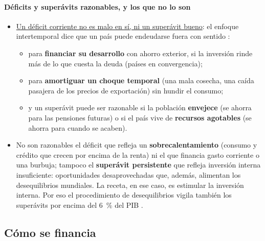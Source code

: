 \documentclass[11pt]{article}
\begin{document}
\paragraph{Déficits y superávits razonables, y los que no lo son}
\begin{itemize}
\item \uline{Un déficit corriente no es malo en sí, ni un superávit bueno}: el enfoque intertemporal dice que un país puede endeudarse fuera con sentido \parencite{FMI2013CaseStudy,BlanchardGiavazzi2002}:
  \begin{itemize}
  \item para \textbf{financiar su desarrollo} con ahorro exterior, si la inversión rinde más de lo que cuesta la deuda (países en convergencia);
  \item para \textbf{amortiguar un choque temporal} (una mala cosecha, una caída pasajera de los precios de exportación) sin hundir el consumo;
  \item y un superávit puede ser razonable si la población \textbf{envejece} (se ahorra para las pensiones futuras) o si el país vive de \textbf{recursos agotables} (se ahorra para cuando se acaben).
  \end{itemize}
\item No son razonables el déficit que refleja un \textbf{sobrecalentamiento} (consumo y crédito que crecen por encima de la renta) ni el que financia gasto corriente o una burbuja; tampoco el \textbf{superávit persistente} que refleja inversión interna insuficiente: oportunidades desaprovechadas que, además, alimentan los desequilibrios mundiales. La receta, en ese caso, es estimular la inversión interna. Por eso el procedimiento de desequilibrios vigila también los superávits por encima del 6~\% del PIB \parencite{CE2025AMR2026}.
\end{itemize}

\subsection{Cómo se financia}\label{sec:financiacion}
\end{document}
